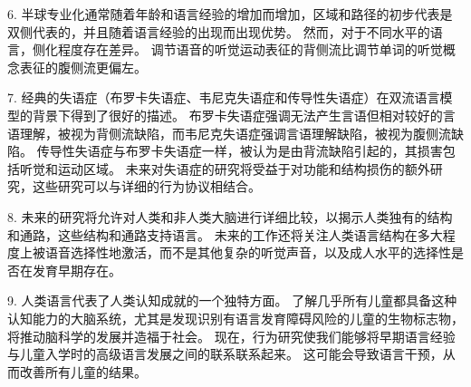 6. 半球专业化通常随着年龄和语言经验的增加而增加，区域和路径的初步代表是双侧代表的，并且随着语言经验的出现而出现优势。
然而，对于不同水平的语言，侧化程度存在差异。
调节语音的听觉运动表征的背侧流比调节单词的听觉概念表征的腹侧流更偏左。


7. 经典的失语症（布罗卡失语症、韦尼克失语症和传导性失语症）在双流语言模型的背景下得到了很好的描述。
布罗卡失语症强调无法产生言语但相对较好的言语理解，被视为背侧流缺陷，而韦尼克失语症强调言语理解缺陷，被视为腹侧流缺陷。
传导性失语症与布罗卡失语症一样，被认为是由背流缺陷引起的，其损害包括听觉和运动区域。
未来对失语症的研究将受益于对功能和结构损伤的额外研究，这些研究可以与详细的行为协议相结合。 


8. 未来的研究将允许对人类和非人类大脑进行详细比较，以揭示人类独有的结构和通路，这些结构和通路支持语言。
未来的工作还将关注人类语言结构在多大程度上被语音选择性地激活，而不是其他复杂的听觉声音，以及成人水平的选择性是否在发育早期存在。 


9. 人类语言代表了人类认知成就的一个独特方面。
了解几乎所有儿童都具备这种认知能力的大脑系统，尤其是发现识别有语言发育障碍风险的儿童的生物标志物，将推动脑科学的发展并造福于社会。
现在，行为研究使我们能够将早期语言经验与儿童入学时的高级语言发展之间的联系联系起来。
这可能会导致语言干预，从而改善所有儿童的结果。



